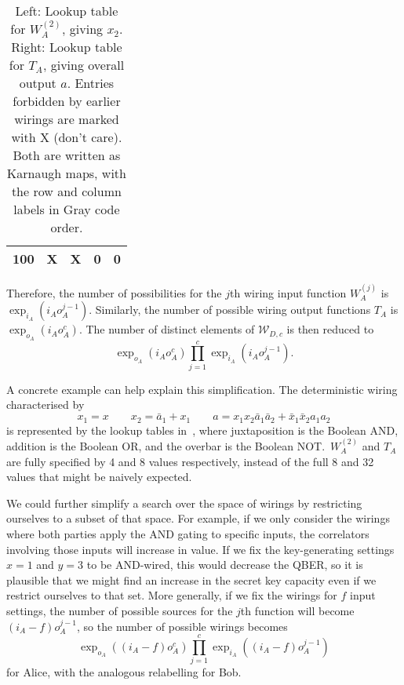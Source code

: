 \documentclass[10pt, a4paper]{article}
\numberwithin{equation}{section} %
\theoremstyle{definition}
\theoremstyle{plain}
\newcommand{\?}{\mathrel{?}} %
\newcommand{\sW}{\mathcal{W}}
\begin{document}
\begin{table}
\begin{minipage}{0.5\linewidth}
\begin{center}
\begin{tabular}{|r|cccc|}
                      100 & X & X & 0 & 0 \\ \hline
                    \end{tabular}
                  \end{center}
                \end{minipage}
                \caption[Lookup tables for a specific wiring.]{Left: Lookup table for \(W_{A}^{(2)}\), giving \(x_2\). Right: Lookup table for \(T_{A}\), giving overall output \(a\). Entries forbidden by earlier wirings are marked with X (don't care). Both are written as Karnaugh maps, with the row and column labels in Gray code order.}\label{tab:wiring_lut}
              \end{table}

              Therefore, the number of possibilities for the \(j\)th wiring input function \(W^{(j)}_{A}\) is \(\exp_{i_A}(i_A o_A^{j-1})\). Similarly, the number of possible wiring output functions \(T_{A}\) is \(\exp_{o_A}(i_A o_A^{c})\). The number of distinct elements of \(\sW_{D,c}\) is then reduced to
              \begin{equation}
                \exp_{o_A}(i_A o_A^c) \prod_{j=1}^c \exp_{i_A}(i_A o_A^{j-1}).
              \end{equation}

              A concrete example can help explain this simplification. The deterministic wiring characterised by
              \[
                x_1 = x \qquad x_2 = \bar{a}_1 + x_1 \qquad a = x_1x_2\bar{a}_1\bar{a}_2 + \bar{x}_1\bar{x}_2a_1a_2\label{eqn:wiringeg}
              \]
              is represented by the lookup tables in~, where juxtaposition is the Boolean AND, addition is the Boolean OR, and the overbar is the Boolean NOT.\ \(W_{A}^{(2)}\) and \(T_{A}\) are fully specified by 4 and 8 values respectively, instead of the full 8 and 32 values that might be naively expected.

              We could further simplify a search over the space of wirings by restricting ourselves to a subset of that space. For example, if we only consider the wirings where both parties apply the AND gating to specific inputs, the correlators involving those inputs will increase in value. If we fix the key-generating settings \(x = 1\) and \(y = 3\) to be AND-wired, this would decrease the QBER, so it is plausible that we might find an increase in the secret key capacity even if we restrict ourselves to that set. More generally, if we fix the wirings for \(f\) input settings, the number of possible sources for the \(j\)th function will become \((i_A - f) o_A^{j-1}\), so the number of possible wirings becomes
              \begin{equation}
                \exp_{o_A}((i_A-f) o_A^c) \prod_{j=1}^c \exp_{i_A}((i_A-f) o_A^{j-1})
              \end{equation}
              for Alice, with the analogous relabelling for Bob.
\end{document}
